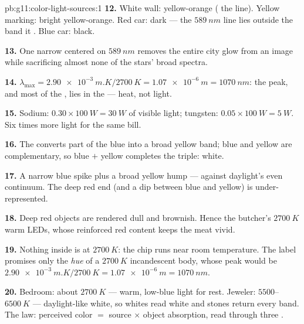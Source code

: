 \begin{solution}{pb:g11:color-light-sources:1}
\textbf{12.} White wall: yellow-orange ( the line). Yellow
marking: bright yellow-orange. Red car: dark --- the $\qty{589}{nm}$
line lies outside the band it . Blue car: black.

\textbf{13.} One narrow  centered on $\qty{589}{nm}$ removes the
entire city glow from an image while sacrificing almost none of the
stars' broad spectra.

\textbf{14.} $\lambda_{\max} = \qty{2.90e-3}{m.K}/\qty{2700}{K} =
\qty{1.07e-6}{m} = \qty{1070}{nm}$: the peak, and most of the ,
lies in the  --- heat, not light.

\textbf{15.} Sodium: $0.30 \times \qty{100}{W} = \qty{30}{W}$ of
visible light; tungsten: $0.05 \times \qty{100}{W} = \qty{5}{W}$. Six
times more light for the same bill.

\textbf{16.} The  converts part of the blue into a broad yellow
band; blue and yellow are complementary, so blue $+$ yellow completes
the triple: white.

\textbf{17.} A narrow blue spike plus a broad yellow hump --- against
daylight's even continuum. The deep red end (and a dip between blue and
yellow) is under-represented.

\textbf{18.} Deep red objects are rendered dull and brownish. Hence the
butcher's $\qty{2700}{K}$ warm LEDs, whose reinforced red content keeps
the meat vivid.

\textbf{19.} Nothing inside is at $\qty{2700}{K}$: the chip runs near
room temperature. The label promises only the \emph{hue} of a
$\qty{2700}{K}$ incandescent body, whose peak would be
$\qty{2.90e-3}{m.K}/\qty{2700}{K} = \qty{1.07e-6}{m} = \qty{1070}{nm}$.

\textbf{20.} Bedroom: about $\qty{2700}{K}$ --- warm, low-blue light
for rest. Jeweler: $5500$--$\qty{6500}{K}$ --- daylight-like white, so
whites read white and stones return every band. The law: perceived
color $=$ source  $\times$ object absorption, read through
three .
\end{solution}
